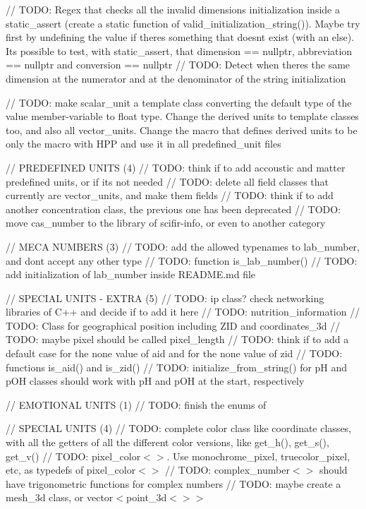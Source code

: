 // TODO\+: Regex that checks all the invalid dimensions initialization inside a static\+\_\+assert (create a static function of valid\+\_\+initialization\+\_\+string()). Maybe try first by undefining the value if there\textquotesingle{}s something that doesn\textquotesingle{}t exist (with an else). It\textquotesingle{}s possible to test, with static\+\_\+assert, that dimension == nullptr, abbreviation == nullptr and conversion == nullptr // TODO\+: Detect when there\textquotesingle{}s the same dimension at the numerator and at the denominator of the string initialization

// TODO\+: make scalar\+\_\+unit a template class converting the default type of the value member-\/variable to float type. Change the derived units to template classes too, and also all vector\+\_\+units. Change the macro that defines derived units to be only the macro with HPP and use it in all predefined\+\_\+unit files

// PREDEFINED UNITS (4) // TODO\+: think if to add accoustic and matter predefined units, or if it\textquotesingle{}s not needed // TODO\+: delete all field classes that currently are vector\+\_\+units, and make them fields // TODO\+: think if to add another concentration class, the previous one has been deprecated // TODO\+: move cas\+\_\+number to the library of scifir-\/info, or even to another category

// MECA NUMBERS (3) // TODO\+: add the allowed typenames to lab\+\_\+number, and don\textquotesingle{}t accept any other type // TODO\+: function is\+\_\+lab\+\_\+number() // TODO\+: add initialization of lab\+\_\+number inside README.\+md file

// SPECIAL UNITS -\/ EXTRA (5) // TODO\+: ip class? check networking libraries of C++ and decide if to add it here // TODO\+: nutrition\+\_\+information // TODO\+: Class for geographical position including ZID and coordinates\+\_\+3d // TODO\+: maybe pixel should be called pixel\+\_\+length // TODO\+: think if to add a default case for the none value of aid and for the none value of zid // TODO\+: functions is\+\_\+aid() and is\+\_\+zid() // TODO\+: initialize\+\_\+from\+\_\+string() for pH and p\+OH classes should work with pH and p\+OH at the start, respectively

// EMOTIONAL UNITS (1) // TODO\+: finish the enums of 

// SPECIAL UNITS (4) // TODO\+: complete color class like coordinate classes, with all the getters of all the different color versions, like get\+\_\+h(), get\+\_\+s(), get\+\_\+v() // TODO\+: pixel\+\_\+color$<$$>$. Use monochrome\+\_\+pixel, truecolor\+\_\+pixel, etc, as typedefs of pixel\+\_\+color$<$$>$ // TODO\+: complex\+\_\+number$<$$>$ should have trigonometric functions for complex numbers // TODO\+: maybe create a mesh\+\_\+3d class, or vector$<$point\+\_\+3d$<$$>$$>$

